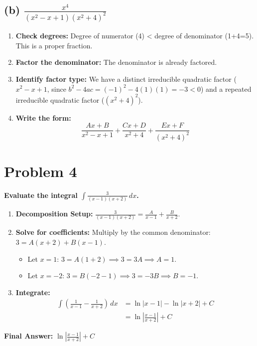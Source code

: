 \documentclass{article}
\begin{document}
\subsection*{(b) $\displaystyle\frac{x^4}{(x^2-x+1)(x^2+4)^2}$}
\begin{enumerate}
    \item \textbf{Check degrees:} Degree of numerator (4) < degree of denominator (1+4=5). This is a proper fraction.
    \item \textbf{Factor the denominator:} The denominator is already factored.
    \item \textbf{Identify factor type:} We have a distinct irreducible quadratic factor ($x^2-x+1$, since $b^2-4ac = (-1)^2-4(1)(1) = -3 < 0$) and a repeated irreducible quadratic factor ($(x^2+4)^2$).
    \item \textbf{Write the form:}
    \[ \frac{Ax+B}{x^2-x+1} + \frac{Cx+D}{x^2+4} + \frac{Ex+F}{(x^2+4)^2} \]
\end{enumerate}

\section{Problem 4}
\textbf{Evaluate the integral $\displaystyle\int \frac{3}{(x-1)(x+2)} \,dx$.}
\begin{enumerate}
    \item \textbf{Decomposition Setup:} $\displaystyle\frac{3}{(x-1)(x+2)} = \frac{A}{x-1} + \frac{B}{x+2}$.
    \item \textbf{Solve for coefficients:} Multiply by the common denominator: $3 = A(x+2) + B(x-1)$.
    \begin{itemize}
        \item Let $x=1$: $3 = A(1+2) \implies 3 = 3A \implies A=1$.
        \item Let $x=-2$: $3 = B(-2-1) \implies 3 = -3B \implies B=-1$.
    \end{itemize}
    \item \textbf{Integrate:}
    \begin{align*}
    \int \left( \frac{1}{x-1} - \frac{1}{x+2} \right) \,dx &= \ln|x-1| - \ln|x+2| + C \\
    &= \ln\left|\frac{x-1}{x+2}\right| + C
    \end{align*}
\end{enumerate}
\textbf{Final Answer:} $\displaystyle\ln\left|\frac{x-1}{x+2}\right| + C$
\end{document}
